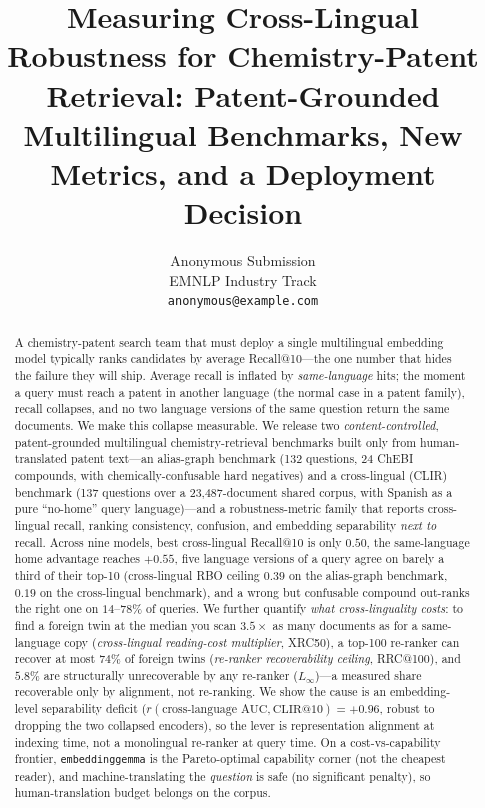 \documentclass[11pt]{article}
\title{Measuring Cross-Lingual Robustness for Chemistry-Patent Retrieval:
Patent-Grounded Multilingual Benchmarks, New Metrics, and a Deployment Decision}
\author{Anonymous Submission \\
  EMNLP Industry Track \\
  \texttt{anonymous@example.com}}
\begin{document}
\maketitle

\begin{abstract}
A chemistry-patent search team that must deploy a single multilingual
embedding model typically ranks candidates by average Recall@10---the one
number that hides the failure they will ship. Average recall is inflated by
\emph{same-language} hits; the moment a query must reach a patent in another
language (the normal case in a patent family), recall collapses, and no two
language versions of the same question return the same documents. We make this
collapse measurable. We release two \emph{content-controlled},
patent-grounded multilingual chemistry-retrieval benchmarks built only from
human-translated patent text---an alias-graph benchmark (132 questions, 24
ChEBI compounds, with chemically-confusable hard negatives) and a cross-lingual
(CLIR) benchmark (137 questions over a 23{,}487-document shared corpus, with
Spanish as a pure ``no-home'' query language)---and a robustness-metric family
that reports cross-lingual recall, ranking consistency, confusion, and
embedding separability \emph{next to} recall. Across nine models, best
cross-lingual Recall@10 is only $0.50$, the same-language home advantage
reaches $+0.55$, five language versions of a query agree on barely a third of
their top-10 (cross-lingual RBO ceiling $0.39$ on the alias-graph benchmark,
$0.19$ on the cross-lingual benchmark), and a wrong but confusable compound
out-ranks the right one on $14$--$78\%$ of queries. We further quantify
\emph{what cross-linguality costs}: to find a foreign twin at the median you
scan $3.5\times$ as many documents as for a same-language copy
(\emph{cross-lingual reading-cost multiplier}, XRC50), a top-100 re-ranker
can recover at most $74\%$ of foreign twins (\emph{re-ranker recoverability
ceiling}, RRC@100), and $5.8\%$ are structurally unrecoverable by any re-ranker
($L_\infty$)---a measured share recoverable only by alignment, not re-ranking. We
show the cause is an embedding-level separability
deficit ($r(\text{cross-language AUC},\text{CLIR@10})=+0.96$, robust to dropping
the two collapsed encoders), so the lever is representation alignment at
indexing time, not a monolingual re-ranker at query time. On a cost-vs-capability
frontier, \texttt{embeddinggemma} is the Pareto-optimal capability corner (not the
cheapest reader), and machine-translating the \emph{question} is safe (no
significant penalty), so human-translation budget belongs on the corpus.
\end{abstract}
\end{document}
